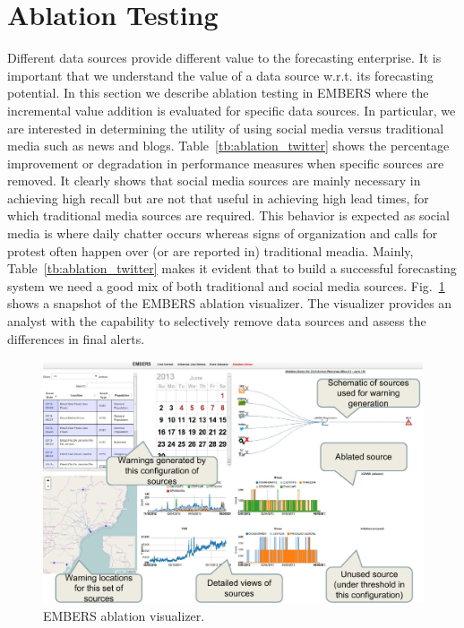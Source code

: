 \section{Ablation Testing}
\label{sec:ablation}
Different data sources provide different value to
the forecasting enterprise. It is important that we understand the
value of a data source w.r.t. its forecasting potential.
In this section we describe ablation testing in EMBERS where the incremental
value addition is evaluated for specific data sources. In particular,
we are interested in determining the utility of using social
media versus traditional media such as news and blogs.
Table~\ref{tb:ablation_twitter} shows the percentage improvement
or degradation in performance measures when specific sources
are removed.
It clearly shows that social media sources are mainly necessary in achieving high recall but are not that useful in achieving high
lead times, for which traditional media sources are required. This
behavior is expected as social media is where daily chatter
occurs whereas signs of organization and calls for protest often
happen over (or are reported in) traditional meadia.
Mainly, Table~\ref{tb:ablation_twitter} makes it evident that to build a successful forecasting system we need a good mix
of both traditional and social media sources. Fig.~\ref{fig:ablation} shows a snapshot of the EMBERS ablation visualizer. The visualizer provides an
analyst with the capability to selectively
remove data sources and assess the differences in final alerts.

\begin{figure}
\includegraphics[width=\columnwidth]{figures/cu/ablation.pdf}
\caption{EMBERS ablation visualizer.}
\label{fig:ablation}
\end{figure}


